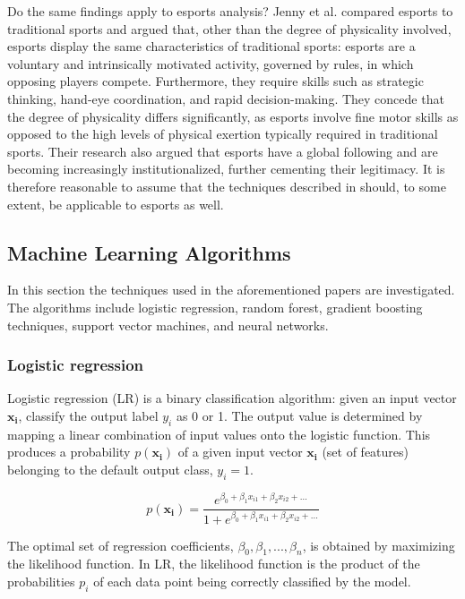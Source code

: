 Do the same findings apply to esports analysis? Jenny et al. \cite{def-esports} compared esports to traditional sports and argued that, other than the degree of physicality involved, esports display the same characteristics of traditional sports: esports are a voluntary and intrinsically motivated activity, governed by rules, in which opposing players compete. Furthermore, they require skills such as strategic thinking, hand-eye coordination, and rapid decision-making. They concede that the degree of physicality differs significantly, as esports involve fine motor skills as opposed to the high levels of physical exertion typically required in traditional sports. Their research also argued that esports have a global following and are becoming increasingly institutionalized, further cementing their legitimacy. It is therefore reasonable to assume that the techniques described in \cite{mlsports} should, to some extent, be applicable to esports as well. 

\subsection{Machine Learning Algorithms}

In this section the techniques used in the aforementioned papers are investigated. The algorithms include logistic regression, random forest, gradient boosting techniques, support vector machines, and neural networks.

\subsubsection{Logistic regression}

Logistic regression (LR) is a binary classification algorithm: given an input vector $\bm{x_i}$, classify the output label $y_i$ as 0 or 1. The output value is determined by mapping a linear combination of input values onto the logistic function. This produces a probability $p(\bm{x_i})$ of a given input vector $\bm{x_i}$ (set of features) belonging to the default output class, $y_i = 1$. 

\[ p(\bm{x_i}) = \frac{e^{\beta_0 + \beta_1x_{i1} + \beta_2x_{i2} + \ldots}}{1 + e^{\beta_0 + \beta_1x_{i1} + \beta_2x_{i2} + \ldots}}  \]

The optimal set of regression coefficients, ${\beta_0, \beta_1, ..., \beta_n}$, is obtained by maximizing the likelihood function. In LR, the likelihood function is the product of the probabilities $p_i$ of each data point being correctly classified by the model. 

